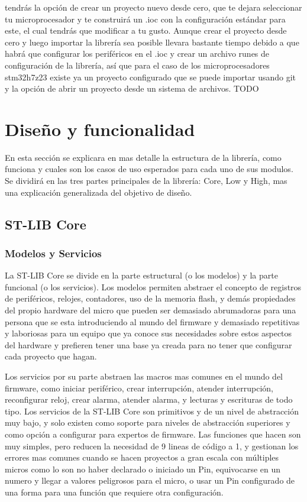 \documentclass{report}
\begin{document}
tendrás la opción de crear un proyecto nuevo desde cero, que te dejara seleccionar tu microprocesador y te construirá un .ioc con la configuración estándar para este, el cual tendrás que modificar a tu gusto. Aunque crear el proyecto desde cero y luego importar la librería sea posible llevara bastante tiempo debido a que habrá que configurar los periféricos en el .ioc y crear un archivo runes de configuración de la librería, así que para el caso de los microprocesadores stm32h7z23 existe ya un proyecto configurado que se puede importar usando git y la opción de abrir un proyecto desde un sistema de archivos. TODO

\newpage

\section{Diseño y funcionalidad}
En esta sección se explicara en mas detalle la estructura de la librería, como funciona y cuales son los casos de uso esperados para cada uno de sus modulos. Se dividirá en las tres partes principales de la librería: Core, Low y High, mas una explicación generalizada del objetivo de diseño. 
\subsection{ST-LIB Core}
\subsubsection{Modelos y Servicios}
La ST-LIB Core se divide en la parte estructural (o los modelos) y la parte funcional (o los servicios). Los modelos permiten abstraer el concepto de registros de periféricos, relojes, contadores, uso de la memoria flash, y demás propiedades del propio hardware del micro que pueden ser demasiado abrumadoras para una persona que se esta introduciendo al mundo del firmware y demasiado repetitivas y laboriosas para un equipo que ya conoce sus necesidades sobre estos aspectos del hardware y prefieren tener una base ya creada para no tener que configurar cada proyecto que hagan. \par \vspace{0.3 cm}

Los servicios por su parte abstraen las macros mas comunes en el mundo del firmware, como iniciar periférico, crear interrupción, atender interrupción, reconfigurar reloj, crear alarma, atender alarma, y lecturas y escrituras de todo tipo. Los servicios de la ST-LIB Core son primitivos y de un nivel de abstracción muy bajo, y solo existen como soporte para niveles de abstracción superiores y como opción a configurar para expertos de firmware. Las funciones que hacen son muy simples, pero reducen la necesidad de 9 lineas de código a 1, y gestionan los errores mas comunes cuando se hacen proyectos a gran escala con múltiples micros como lo son no haber declarado o iniciado un Pin, equivocarse en un numero y llegar a valores peligrosos para el micro, o usar un Pin configurado de una forma para una función que requiere otra configuración. \par \vspace{0.3 cm}
\end{document}

